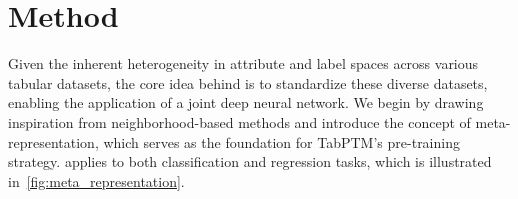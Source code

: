 \section{Method}
Given the inherent heterogeneity in attribute and label spaces across various tabular datasets, the core idea behind \ours is to standardize these diverse datasets, enabling the application of a joint deep neural network.
We begin by drawing inspiration from neighborhood-based methods and introduce the concept of meta-representation, which serves as the foundation for {\sc TabPTM}'s pre-training strategy. 
\ours applies to both classification and regression tasks, which is illustrated in~\autoref{fig:meta_representation}. 


